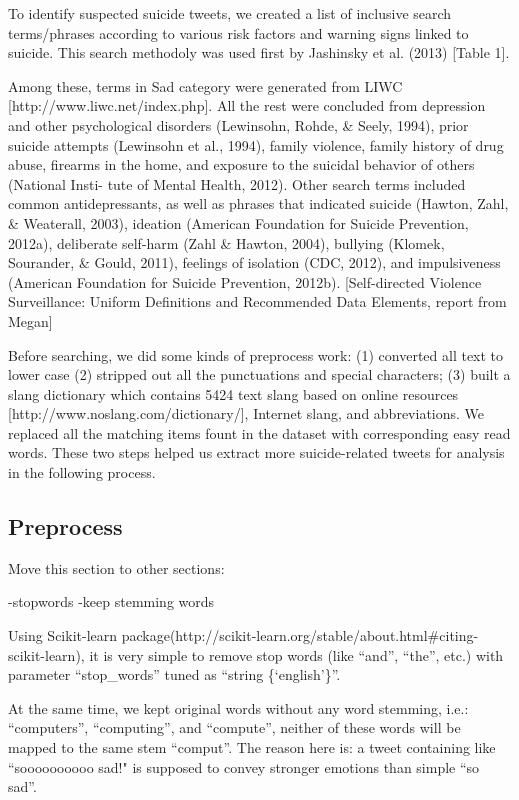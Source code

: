 \documentclass[11pt]{article}
\begin{document}
To identify suspected suicide tweets, we created a list of inclusive search terms/phrases according to various risk factors and warning signs linked to suicide. This search methodoly was used first by Jashinsky et al. (2013) [Table 1].



Among these, terms in Sad category were generated from LIWC [http://www.liwc.net/index.php]. All the rest were concluded from depression and other psychological disorders (Lewinsohn, Rohde, \& Seely, 1994), prior suicide attempts (Lewinsohn et al., 1994), family violence, family history of drug abuse, firearms in the home, and exposure to the suicidal behavior of others (National Insti- tute of Mental Health, 2012). Other search terms included common antidepressants, as well as phrases that indicated suicide (Hawton, Zahl, \& Weaterall, 2003), ideation (American Foundation for Suicide Prevention, 2012a), deliberate self-harm (Zahl \& Hawton, 2004), bullying (Klomek, Sourander, \& Gould, 2011), feelings of isolation (CDC, 2012), and impulsiveness (American Foundation for Suicide Prevention, 2012b). [Self-directed Violence Surveillance: Uniform Definitions and Recommended Data Elements, report from Megan]

Before searching, we did some kinds of preprocess work:  (1) converted all text to lower case (2) stripped out all the punctuations and special characters; (3) built a slang dictionary which contains 5424 text slang based on online resources [http://www.noslang.com/dictionary/], Internet slang, and abbreviations. We replaced all the matching items fount in the dataset with corresponding easy read words. These two steps helped us extract more suicide-related tweets for analysis in the following process.


\subsection{Preprocess}

Move this section to other sections:

-stopwords
-keep stemming words

Using Scikit-learn package(http://scikit-learn.org/stable/about.html\#citing-scikit-learn), it is very simple to remove stop words (like ``and'', ``the'', etc.) with parameter ``stop\_words'' tuned as ``string \{`english'\}''. 

At the same time, we kept original words without any word stemming, i.e.: ``computers'', ``computing'', and ``compute'', neither of these words will be mapped to the same stem ``comput''. The reason here is: a tweet containing like ``soooooooooo sad!" is supposed to convey stronger emotions than simple ``so sad''.
\end{document}
